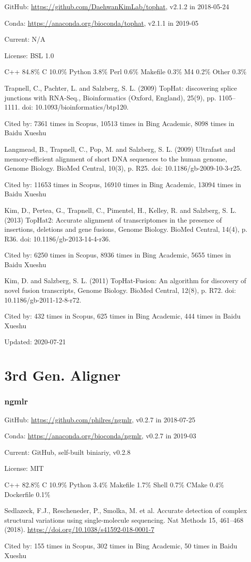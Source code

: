 \documentclass[]{article}
\newcommand{\cb}[3]{\par Cited by: {\color{blue}\Huge #1} times in Scopus, {\color{blue}\Huge #2} times in Bing Academic, {\color{blue}\Huge #3} times in Baidu Xueshu}
\begin{document}
GitHub: \url{https://github.com/DaehwanKimLab/tophat}, v2.1.2 in 2018-05-24

Conda: \url{https://anaconda.org/bioconda/tophat}, v2.1.1 in 2019-05

Current: N/A

License: BSL 1.0

C++ 84.8\% C 10.0\% Python 3.8\% Perl 0.6\% Makefile 0.3\% M4 0.2\% Other 0.3\%

Trapnell, C., Pachter, L. and Salzberg, S. L. (2009) TopHat: discovering splice junctions with RNA-Seq., Bioinformatics (Oxford, England), 25(9), pp. 1105–1111. doi: 10.1093/bioinformatics/btp120.\cb{7361}{10513}{8098}

Langmead, B., Trapnell, C., Pop, M. and Salzberg, S. L. (2009) Ultrafast and memory-efficient alignment of short DNA sequences to the human genome, Genome Biology. BioMed Central, 10(3), p. R25. doi: 10.1186/gb-2009-10-3-r25.\cb{11653}{16910}{13094}

Kim, D., Pertea, G., Trapnell, C., Pimentel, H., Kelley, R. and Salzberg, S. L. (2013) TopHat2: Accurate alignment of transcriptomes in the presence of insertions, deletions and gene fusions, Genome Biology. BioMed Central, 14(4), p. R36. doi: 10.1186/gb-2013-14-4-r36.\cb{6250}{8936}{5655}

Kim, D. and Salzberg, S. L. (2011) TopHat-Fusion: An algorithm for discovery of novel fusion transcripts, Genome Biology. BioMed Central, 12(8), p. R72. doi: 10.1186/gb-2011-12-8-r72.\cb{432}{625}{444}

Updated: 2020-07-21

\part{3rd Gen. Aligner}

\section{ngmlr}

GitHub: \url{https://github.com/philres/ngmlr}, v0.2.7 in 2018-07-25

Conda: \url{https://anaconda.org/bioconda/ngmlr}, v0.2.7 in 2019-03

Current: GitHub, self-built biniariy, v0.2.8

License: MIT

C++ 82.8\% C 10.9\% Python 3.4\% Makefile 1.7\% Shell 0.7\% CMake 0.4\% Dockerfile 0.1\% 

Sedlazeck, F.J., Rescheneder, P., Smolka, M. et al. Accurate detection of complex structural variations using single-molecule sequencing. Nat Methods 15, 461–468 (2018). \url{https://doi.org/10.1038/s41592-018-0001-7}\cb{155}{302}{50}
\end{document}
